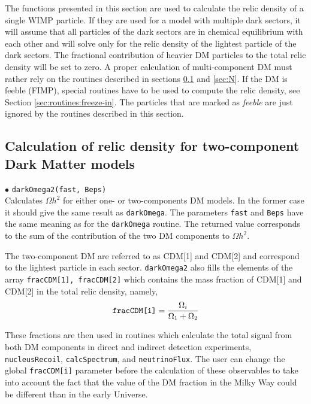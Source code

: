 \documentclass[12pt,a4paper]{article}
\begin{document}
The functions presented in this section are used to calculate the  relic density of a single WIMP
particle. If they are used for a model with multiple dark sectors, it will assume that all particles of the dark sectors are in chemical equilibrium with each other and will solve only for the relic density of the lightest  particle of the dark sectors. The fractional contribution of heavier  DM particles to the total relic density will be set to zero. A proper calculation of multi-component DM must rather rely on the routines described in sections \ref{sec:two} and \ref{sec:N}.  
If the DM is feeble (FIMP), special routines have to be used to compute the relic density, see Section \ref{sec:routines:freeze-in}. 
The particles that are marked as {\it
feeble} are just ignored by the  routines described in this section. 

\subsection{Calculation of relic density for  two-component Dark Matter models}
\label{sec:two}

$\bullet$ \verb|darkOmega2(fast, Beps)|\\
Calculates $\Omega h^2$ for either  one- or  two-components DM models. In the former case it should give the same result as \verb|darkOmega|.
The parameters {\tt fast} and {\tt Beps} have the same meaning as for the {\tt darkOmega} routine.
The returned value corresponds to the sum of the contribution of the two  DM components to  $\Omega h^2$.  


The two-component DM are  referred to as CDM[1] and CDM[2] and correspond to  the lightest particle in each sector. 
 \verb|darkOmega2| also fills the  elements of  the array {\tt fracCDM[1], fracCDM[2]} which contains the mass fraction
of CDM[1] and CDM[2] in the total relic density, namely,  
\begin{equation}
  \verb|fracCDM[i]|=\frac{\Omega_i}{ \Omega_1+\Omega_2}
\end{equation}


These fractions are   
  then used in routines which calculate the total signal from both  DM components  in direct and indirect detection experiments,
 \verb|nucleusRecoil|, \verb|calcSpectrum|,  and \verb|neutrinoFlux|.  The user can change the global {\tt  fracCDM[i]} parameter before the calculation of these observables
to take into account the fact that the value of the DM fraction in the Milky Way could be different than   in the early Universe.
\end{document}

